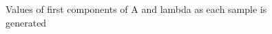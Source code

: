 \documentclass{article}
\begin{document}
\begin{figure}[H]
	\centerline{
		}
	\caption{Values of first components of A and lambda as each sample is generated}
	\label{1.fig:r1_seq}
\end{figure}
\end{document}
